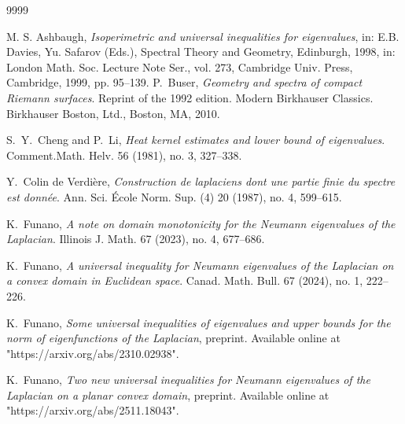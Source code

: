 \documentclass[12pt]{amsart}
\theoremstyle{plain}
\theoremstyle{remark}
\begin{document}
\begin{thebibliography}{9999}

M. S. Ashbaugh, \textit{Isoperimetric and universal inequalities for eigenvalues}, in: E.B. Davies, Yu. Safarov (Eds.), Spectral Theory and Geometry, Edinburgh, 1998, in: London Math. Soc. Lecture Note Ser., vol. 273, Cambridge Univ. Press, Cambridge, 1999, pp. 95--139.
P.~Buser, \textit{Geometry and spectra of compact Riemann
        surfaces}. Reprint of the 1992 edition. Modern Birkhauser
        Classics. Birkhauser Boston, Ltd., Boston, MA, 2010.


S.~Y.~Cheng and P.~Li, \textit{Heat kernel estimates and lower bound of eigenvalues}. Comment.Math. Helv. 56 (1981), no. 3, 327--338.


Y.~Colin de Verdi\`{e}re, \textit{Construction de laplaciens dont une partie finie du spectre est donn\'{e}e}.
Ann. Sci. \'{E}cole Norm. Sup. (4) 20 (1987), no. 4, 599--615.

K.~Funano, \textit{A note on domain monotonicity for the Neumann eigenvalues of the Laplacian}. Illinois J. Math. 67 (2023), no. 4, 677--686.

 K.~Funano, \textit{A universal inequality for Neumann eigenvalues of the Laplacian on a convex domain in Euclidean space}. Canad. Math. Bull. 67 (2024), no. 1, 222--226.

 K.~Funano, \textit{Some universal inequalities of eigenvalues and upper bounds for the  norm of eigenfunctions of the Laplacian}, preprint. Available online at "https://arxiv.org/abs/2310.02938". 

 K.~Funano, \textit{Two new universal inequalities for Neumann eigenvalues of the Laplacian on a planar convex domain}, preprint. Available online at "https://arxiv.org/abs/2511.18043".



\end{thebibliography}
\end{document}
